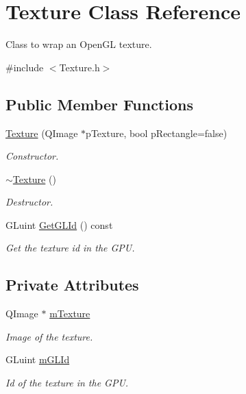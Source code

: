 \hypertarget{class_texture}{\section{Texture Class Reference}
\label{class_texture}
}


Class to wrap an Open\+G\+L texture.  




{\ttfamily \#include $<$Texture.\+h$>$}

\subsection*{Public Member Functions}
\begin{DoxyCompactItemize}
\item 
\hyperlink{class_texture_a0854e99ae859675ee8870d621440c883}{Texture} (Q\+Image $\ast$p\+Texture, bool p\+Rectangle=false)
\begin{DoxyCompactList}\small\item\em Constructor. \end{DoxyCompactList}\item 
\hyperlink{class_texture_a09c4bcb7462f64c1d20fa69dba3cee8a}{$\sim$\+Texture} ()
\begin{DoxyCompactList}\small\item\em Destructor. \end{DoxyCompactList}\item 
G\+Luint \hyperlink{class_texture_a5e18de283f4e586ec1c49407096f0eb1}{Get\+G\+L\+Id} () const 
\begin{DoxyCompactList}\small\item\em Get the texture id in the G\+P\+U. \end{DoxyCompactList}\end{DoxyCompactItemize}
\subsection*{Private Attributes}
\begin{DoxyCompactItemize}
\item 
Q\+Image $\ast$ \hyperlink{class_texture_ad7a2196e87052cd1eed2e8574938e6ba}{m\+Texture}
\begin{DoxyCompactList}\small\item\em Image of the texture. \end{DoxyCompactList}\item 
G\+Luint \hyperlink{class_texture_ac7dad9160f7c8335c4e04f6b55b2f66d}{m\+G\+L\+Id}
\begin{DoxyCompactList}\small\item\em Id of the texture in the G\+P\+U. \end{DoxyCompactList}\end{DoxyCompactItemize}


